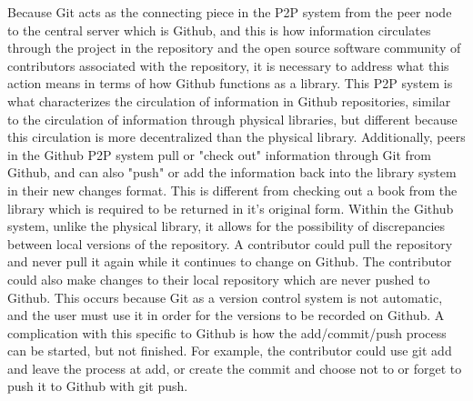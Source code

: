 Because Git acts as the connecting piece in the P2P system from the peer node to the central server which is Github, and this is how information circulates through the project in the repository and the open source software community of contributors associated with the repository, it is necessary to address what this action means in terms of how Github functions as a library. This P2P system is what characterizes the circulation of information in Github repositories, similar to the circulation of information through physical libraries, but different because this circulation is more decentralized than the physical library. Additionally, peers in the Github P2P system pull or "check out" information through Git from Github, and can also "push" or add the information back into the library system in their new changes format. This is different from checking out a book from the library which is required to be returned in it's original form. Within the Github system, unlike the physical library, it allows for the possibility of discrepancies between local versions of the repository. A contributor could pull the repository and never pull it again while it continues to change on Github. The contributor could also make changes to their local repository which are never pushed to Github. This occurs because Git as a version control system is not automatic, and the user must use it in order for the versions to be recorded on Github. A complication with this specific to Github is how the add/commit/push process can be started, but not finished. For example, the contributor could use git add and leave the process at add, or create the commit and choose not to or forget to push it to Github with git push. 
